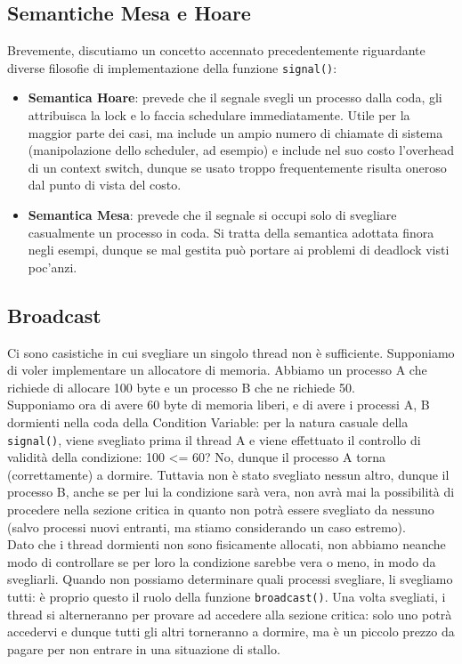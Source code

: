 \documentclass[12pt]{report}
\begin{document}
	\subsection{Semantiche Mesa e Hoare}
	Brevemente, discutiamo un concetto accennato precedentemente riguardante diverse filosofie di implementazione della funzione \texttt{signal()}:
	\begin{itemize}
		\item \textbf{Semantica Hoare}: prevede che il segnale svegli un processo dalla coda, gli attribuisca la lock e lo faccia schedulare immediatamente. Utile per la maggior parte dei casi, ma include un ampio numero di chiamate di sistema (manipolazione dello scheduler, ad esempio) e include nel suo costo l'overhead di un context switch, dunque se usato troppo frequentemente risulta oneroso dal punto di vista del costo.
		
		\item \textbf{Semantica Mesa}: prevede che il segnale si occupi solo di svegliare casualmente un processo in coda. Si tratta della semantica adottata finora negli esempi, dunque se mal gestita può portare ai problemi di deadlock visti poc'anzi.
	\end{itemize}
	
	\subsection{Broadcast}
	Ci sono casistiche in cui svegliare un singolo thread non è sufficiente. Supponiamo di voler implementare un allocatore di memoria. Abbiamo un processo A che richiede di allocare 100 byte e un processo B che ne richiede 50.\\
	Supponiamo ora di avere 60 byte di memoria liberi, e di avere i processi A, B dormienti nella coda della Condition Variable: per la natura casuale della \texttt{signal()}, viene svegliato prima il thread A e viene effettuato il controllo di validità della condizione: 100 <= 60? No, dunque il processo A torna (correttamente) a dormire. Tuttavia non è stato svegliato nessun altro, dunque il processo B, anche se per lui la condizione sarà vera, non avrà mai la possibilità di procedere nella sezione critica in quanto non potrà essere svegliato da nessuno (salvo processi nuovi entranti, ma stiamo considerando un caso estremo).\\
	Dato che i thread dormienti non sono fisicamente allocati, non abbiamo neanche modo di controllare se per loro la condizione sarebbe vera o meno, in modo da svegliarli. Quando non possiamo determinare quali processi svegliare, li svegliamo tutti: è proprio questo il ruolo della funzione \texttt{broadcast()}.
	Una volta svegliati, i thread si alterneranno per provare ad accedere alla sezione critica: solo uno potrà accedervi e dunque tutti gli altri torneranno a dormire, ma è un piccolo prezzo da pagare per non entrare in una situazione di stallo.
	
\end{document}
